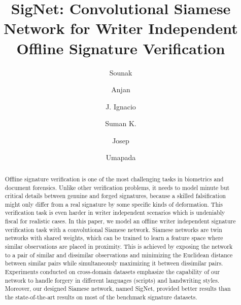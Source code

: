 \documentclass[times,twocolumn,final]{elsarticle}
\begin{document}
\begin{frontmatter}

\title{SigNet: Convolutional Siamese Network for Writer Independent Offline Signature Verification}

\author[1]{Sounak } 
\author[1]{Anjan }
\author[1]{J. Ignacio }
\author[1]{Suman K.}
\author[1]{Josep }
\author[2]{Umapada }

\address[1]{Computer Vision Center, Computer Science Dept., 
Universitat Aut\`{o}noma de Barcelona, 
Edifici O, Campus UAB, 08193 Bellaterra, Spain}
\address[2]{Computer Vision and Pattern Recognition Unit,
Indian Statistical Institute, 
203, B. T. Road, Kolkata-700108, India}



\begin{abstract}
Offline signature verification is one of the most challenging tasks in biometrics and document forensics. Unlike other verification problems, it needs to model minute but critical details between genuine and forged signatures, because a skilled falsification might only differ from a real signature by some specific kinds of deformation. This verification task is even harder in writer independent scenarios which is undeniably fiscal for realistic cases. In this paper, we model an offline writer independent signature verification task with a convolutional Siamese network. Siamese networks are twin networks with shared weights, which can be trained to learn a feature space where similar observations are placed in proximity. This is achieved by exposing the network to a pair of similar and dissimilar observations and minimizing the Euclidean distance between similar pairs while simultaneously maximizing it between dissimilar pairs. Experiments conducted on cross-domain datasets emphasize the capability of our network to handle forgery in different languages (scripts) and handwriting styles. Moreover, our designed Siamese network, named SigNet, provided better results than  the state-of-the-art results on most of the benchmark signature datasets.
\end{abstract} 
\begin{keyword}

\end{keyword}

\end{frontmatter}
\end{document}
